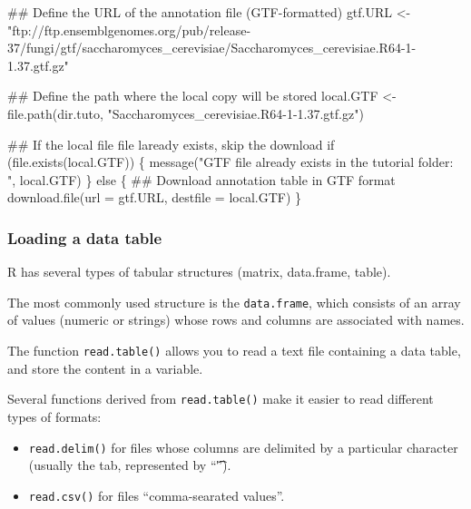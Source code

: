 \documentclass[]{article}
\newenvironment{Shaded}{\begin{snugshade}}{\end{snugshade}}
\newcommand{\KeywordTok}[1]{\textcolor[rgb]{0.94,0.87,0.69}{#1}}
\newcommand{\DataTypeTok}[1]{\textcolor[rgb]{0.87,0.87,0.75}{#1}}
\newcommand{\StringTok}[1]{\textcolor[rgb]{0.80,0.58,0.58}{#1}}
\newcommand{\ControlFlowTok}[1]{\textcolor[rgb]{0.94,0.87,0.69}{#1}}
\newcommand{\NormalTok}[1]{\textcolor[rgb]{0.80,0.80,0.80}{#1}}
\providecommand{\tightlist}{%
  \setlength{\itemsep}{0pt}\setlength{\parskip}{0pt}}
\begin{document}
\begin{Shaded}
\begin{Highlighting}[]
\NormalTok{## Define the URL of the annotation file (GTF-formatted)}
\NormalTok{gtf.URL <-}\StringTok{ "ftp://ftp.ensemblgenomes.org/pub/release-37/fungi/gtf/saccharomyces_cerevisiae/Saccharomyces_cerevisiae.R64-1-1.37.gtf.gz"}

\NormalTok{## Define the path where the local copy will be stored}
\NormalTok{local.GTF <-}\StringTok{ }\KeywordTok{file.path}\NormalTok{(dir.tuto, }\StringTok{"Saccharomyces_cerevisiae.R64-1-1.37.gtf.gz"}\NormalTok{)}

\NormalTok{## If the local file file laready exists, skip the download}
\ControlFlowTok{if}\NormalTok{ (}\KeywordTok{file.exists}\NormalTok{(local.GTF)) \{}
  \KeywordTok{message}\NormalTok{(}\StringTok{"GTF file already exists in the tutorial folder: "}\NormalTok{, local.GTF)}
\NormalTok{\} }\ControlFlowTok{else}\NormalTok{ \{}
\NormalTok{  ## Download annotation table in GTF format}
  \KeywordTok{download.file}\NormalTok{(}\DataTypeTok{url =}\NormalTok{ gtf.URL, }\DataTypeTok{destfile =}\NormalTok{ local.GTF)}
\NormalTok{\}}
\end{Highlighting}
\end{Shaded}

\subsubsection{Loading a data table}\label{loading-a-data-table}

R has several types of tabular structures (matrix, data.frame, table).

The most commonly used structure is the \texttt{data.frame}, which
consists of an array of values (numeric or strings) whose rows and
columns are associated with names.

The function \texttt{read.table()} allows you to read a text file
containing a data table, and store the content in a variable.

Several functions derived from \texttt{read.table()} make it easier to
read different types of formats:

\begin{itemize}
\tightlist
\item
  \texttt{read.delim()} for files whose columns are delimited by a
  particular character (usually the tab, represented by ``\t'').
\item
  \texttt{read.csv()} for files ``comma-searated values''.
\end{itemize}
\end{document}
